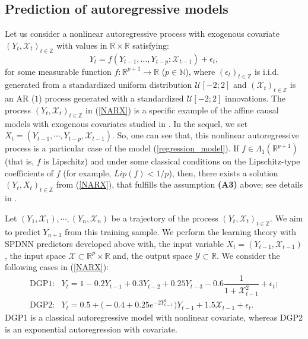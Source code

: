 \documentclass[10pt,twoside]{article}
\numberwithin{equation}{section}
\newcommand{\R}{\ensuremath{\mathbb{R}}}
\newcommand{\Z}{\ensuremath{\mathbb{Z}}}
\newcommand{\N}{\ensuremath{\mathbb{N}}}
\begin{document}
\subsection{Prediction of autoregressive models}\label{Pred_auto_Mod}
%
Let us consider a nonlinear autoregressive process with exogenous covariate $ (Y_t, \mathcal{X}_t)_{t \in \Z} $ with values in $\R \times \R$ satisfying:
%
\begin{equation}\label{NARX}
Y_t = f(Y_{t-1}, \ldots, Y_{t-p}; \mathcal{X}_{t-1}) + \epsilon_t,
\end{equation}
%
for some measurable function $f:\R^{p+1} \rightarrow \R$ ($p \in \N$), 
where $(\epsilon_t)_{t \in \Z}$ is i.i.d. generated from a standardized  uniform distribution $ \mathcal{U} [-2; 2]$ and $(\mathcal{X}_{t})_{t \in \Z}$ is an AR ($1$) process generated with a standardized $\mathcal{U} [-2; 2]$ innovations.
%
The process $ (Y_t, \mathcal{X}_t)_{t \in \Z} $ in (\ref{NARX}) is a specific example of the affine causal models with exogenous covariates studied in \cite{diop2022inference}. 
%
In the sequel,  we set $X_t =  (Y_ {t - 1}, \cdots, Y_ {t-p}, \mathcal{X}_ {t-1}) $. So, one can see that, this nonlinear autoregressive process  is a particular case of the model (\ref{regression_model}).
%
If $f \in \Lambda_{1}(\R^{p+1}) $ (that is, $f$ is Lipschitz) and under some classical conditions on the Lipschitz-type coefficients of $f$ (for example, $Lip(f)<1/p$), then, there exists a solution $ (Y_t, X_t)_{t \in \Z} $ from (\ref{NARX}), that fulfills the assumption \textbf{(A3)} above; see details in \cite{diop2022statistical}. 
 
\medskip
 
Let $ (Y_1, \mathcal{X}_1), \cdots, (Y_n, \mathcal{X}_n) $ be a trajectory of the process $ (Y_t, \mathcal{X}_t)_{t\in \Z}$.
%
 We aim to predict $Y_{n+1}$ from this training sample. 
%
We perform the learning theory with SPDNN predictors developed above with, the input variable $X_t =  (Y_{t - 1}, \mathcal{X}_{t-1})$, the input space $\mathcal{X}\subset \R^p \times \R $ and, the output space $\mathcal{Y} \subset \R$.
% 
 We consider the following cases in (\ref{NARX}):
%
\[
\begin{array}{ll}
\text{DGP1}: & Y_t = 1 - 0.2 Y_{t-1} + 0.3 Y_{t-2} + 0.25 Y_{t-3} - 0.6 \dfrac{1}{1+\mathcal{X}_{t-1}^2} + \epsilon_t; \\
\text{DGP2}: & Y_t  = 0.5 + \big(-0.4 + 0.25e^{-2 Y_{t-1}^2}  \big) Y_{t-1}  +1.5 \mathcal{X}_{t-1} + \epsilon_t.
\end{array} 
\] 
%
DGP1 is a classical autoregressive model with nonlinear covariate, whereas DGP2 is an exponential autoregression with covariate.
\end{document}
